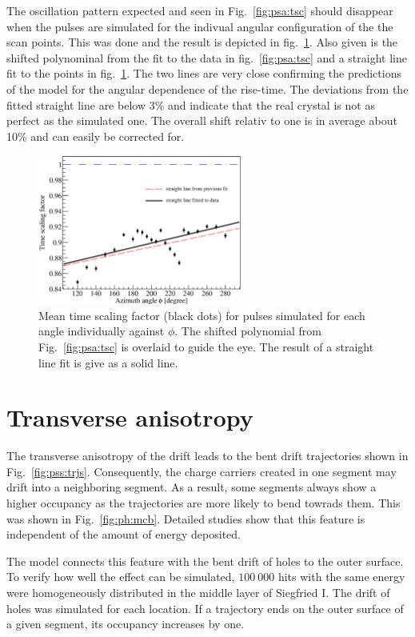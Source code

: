The oscillation pattern expected and seen in Fig.~\ref{fig:psa:tsc} should disappear when the pulses are simulated for the indivual angular configuration of the the scan points. This was done and the result is depicted in fig.~\ref{fig:psa:tsl}. Also given is the shifted polynominal from the fit to the data in 
fig.~\ref{fig:psa:tsc} and a straight line fit to the points in fig.~\ref{fig:psa:tsl}. The two lines are very close confirming the predictions of the model for the angular dependence of the rise-time. The deviations from the fitted straight line are below 3\% and indicate that the real crystal is not as perfect as the simulated one. The overall shift relativ to one is in average about 10\% and can easily be corrected for. 

\begin{figure}[htbp]
\centering
\includegraphics[width=0.6\textwidth]{tsline}
\caption{Mean time scaling factor (black dots) for pulses simulated for each angle individually against $\phi$. The shifted polynomial from Fig.~\ref{fig:psa:tsc} is overlaid to guide the eye. The result of a straight line fit is give as a solid line.}
\label{fig:psa:tsl}
\end{figure}


\section{Transverse anisotropy}
\label{sec:psa:tra}
The transverse anisotropy of the drift leads to the bent drift trajectories shown in Fig.~\ref{fig:pss:trjs}. Consequently, the charge carriers created in one segment may drift into a neighboring segment. As a result, some segments always show a higher occupancy as the trajectories are more likely to bend towrads them. This was shown in Fig.~\ref{fig:ph:mcb}. Detailed studies show that this feature is independent of the amount of energy deposited.

The model connects this feature with the bent drift of holes to the outer surface. To verify how well the effect can be simulated, $100\ 000$ hits with the same energy were homogeneously distributed in the middle 
layer of Siegfried I. The drift of holes was simulated for each location. If a trajectory ends on the outer surface of a given segment, its occupancy increases by one.

